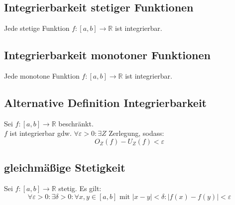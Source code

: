 \documentclass[halfparscip]{scrartcl}
\newcounter{subsection2}
\begin{document}
\subsection{Integrierbarkeit stetiger Funktionen}
Jede stetige Funktion $f: [a,b] \rightarrow \mathbb{R}$ ist integrierbar.

\subsection{Integrierbarkeit monotoner Funktionen}
Jede monotone Funktion $f: [a,b] \rightarrow \mathbb{R}$ ist integrierbar.

\subsection{Alternative Definition Integrierbarkeit}
Sei $f: [a,b] \rightarrow \mathbb{R}$ beschränkt.\\
$f$ ist integrierbar gdw. $\forall \varepsilon > 0 : \exists Z$ Zerlegung, sodass:
\begin{equation*}
	O_Z(f) - U_Z(f) < \varepsilon
\end{equation*}

\subsection{gleichmäßige Stetigkeit}
Sei $f : [a,b] \rightarrow \mathbb{R}$ stetig. Es gilt:
\begin{equation*}
	\forall \varepsilon > 0 : \exists \delta > 0 : \forall x,y \in [a,b] \text{ mit } | x - y | < \delta : |f(x) - f(y)| < \varepsilon
\end{equation*}
 
\end{document}
